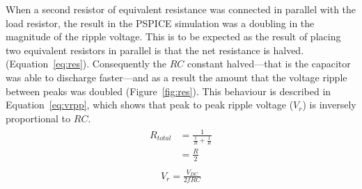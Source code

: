\documentclass[12pt]{article}
\begin{document}
When a second resistor of equivalent resistance was connected in parallel with the load resistor, the result in the PSPICE simulation was a doubling in the magnitude of the ripple voltage. This is to be expected as the result of placing two equivalent resistors in parallel is that the net resistance is halved. (Equation~\ref{eq:res}). Consequently the $RC$ constant halved---that is the capacitor was able to discharge faster---and as a result the amount that the voltage ripple between peaks was doubled (Figure~\ref{fig:res}). This behaviour is described in Equation~\ref{eq:vrpp}, which shows that peak to peak ripple voltage ($V_r$) is inversely proportional to $RC$.
\begin{align}
\begin{split}
 R_{total}&=\frac{1}{\frac{1}{R}+\frac{1}{R}}\\
&=\frac{R}{2}
\end{split}
\label{eq:res}
\end{align}
\begin{align}
\begin{split}
V_{r}=\frac{V_{DC}}{2f RC}
\end{split}
\label{eq:vrpp}
\end{align}
\end{document}
